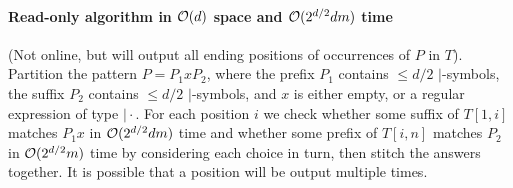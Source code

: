 \documentclass{article}
\begin{document}
\paragraph{Read-only algorithm in $\mathcal{O}(d)$ space and $\mathcal{O}(2^{d/2} d m)$ time} (Not online, but will output all ending positions of occurrences of $P$ in $T$). Partition the pattern $P = P_1 x P_2$, where the prefix $P_1$ contains $\le d/2$ $\mid$-symbols, the suffix $P_2$ contains $\le d/2$ $\mid$-symbols, and $x$ is either empty, or a regular expression of type $\mid \cdot$. For each position $i$ we check whether some suffix of $T[1,i]$ matches $P_1 x$ in $\mathcal{O}(2^{d/2} d m)$ time and whether some prefix of $T[i,n]$ matches $P_2$ in $\mathcal{O}(2^{d/2} m)$ time by considering each choice in turn, then stitch the answers together. It is possible that a position will be output multiple times. 



\end{document}

